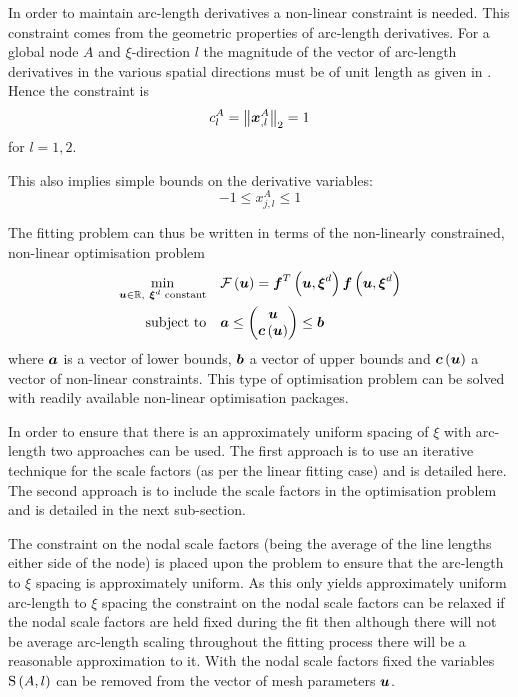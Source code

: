 In order to maintain arc-length derivatives a non-linear constraint is needed.  This
constraint comes from the geometric properties of arc-length derivatives.  For a
global node $A$ and $\xi$-direction $l$ the magnitude of the vector of arc-length
derivatives in the various spatial directions must be of unit length as
given in .  Hence the constraint is
\begin{equation}
  c^{A}_{l}=\norm{\vectr{x}^{A}_{,l}}=1
  \label{eqn:normconstraint}
\end{equation}
for $l=1,2$.

This also implies simple bounds on the derivative variables:
\begin{equation}
  -1 \leq x^{A}_{j,l} \leq 1
\end{equation}

The fitting problem can thus be written in terms of the non-linearly
constrained, non-linear optimisation problem
\begin{equation}
  \begin{split}
    \min_{\vectr{u}\in\mathbb{R},~\vectr{\xi}^{d}\text{ constant}}\quad &
    \fnof{\mathcal{F}}{\vectr{u}}=\fntof{\vectr{f}}{\vectr{u},
      \vectr{\xi}^{d}}\fnof{\vectr{f}}{\vectr{u},\vectr{\xi}^{d}} \\
    \text{subject to} \quad & \vectr{a} \leq 
    \begin{pmatrix} 
      \vectr{u} \\ 
      \fnof{\vectr{c}}{\vectr{u}}
    \end{pmatrix} \leq \vectr{b}
  \end{split}
  \label{eqn:nloproblem}
\end{equation}
where $\boldsymbol{a}$ is a vector of lower bounds, $\boldsymbol{b}$ a vector of upper
bounds and $ \boldsymbol{c}\left( \boldsymbol{u} \right) $ a vector of non-linear constraints. This
type of optimisation problem can be solved with readily available non-linear
optimisation packages.

In order to ensure that there is an approximately uniform spacing of $\xi$
with arc-length two approaches can be used. The first approach is to use an
iterative technique for the scale factors (as per the linear fitting case) and
is detailed here. The second approach is to include the scale factors in the
optimisation problem and is detailed in the next sub-section.

The constraint on the nodal scale factors (being the average of the line
lengths either side of the node) is placed upon the problem to ensure that the
arc-length to $\xi$ spacing is approximately uniform. As this only yields
approximately uniform arc-length to $\xi$ spacing the constraint on the nodal
scale factors can be relaxed \ie if the nodal scale factors are held fixed
during the fit then although there will not be average arc-length scaling
throughout the fitting process there will be a reasonable approximation to it.
With the nodal scale factors fixed the variables $   \mathrm{S} \left( A,l \right)  $ can be removed
from the vector of mesh parameters $\boldsymbol{u}$.

